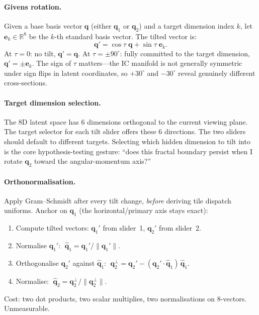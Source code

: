 \documentclass[11pt]{report}
\begin{document}
\paragraph{Givens rotation.} Given a base basis vector $\mathbf q$ (either $\mathbf q_1$ or $\mathbf q_2$) and a target dimension index $k$, let $\mathbf e_k\in\mathbb R^8$ be the $k$-th standard basis vector. The tilted vector is:
\[
\boxed{\mathbf q'=\cos\tau\;\mathbf q+\sin\tau\;\mathbf e_k.}
\]
At $\tau=0$: no tilt, $\mathbf q'=\mathbf q$. At $\tau=\pm 90^\circ$: fully committed to the target dimension, $\mathbf q'=\pm\mathbf e_k$. The sign of $\tau$ matters---the IC manifold is not generally symmetric under sign flips in latent coordinates, so $+30^\circ$ and $-30^\circ$ reveal genuinely different cross-sections.

\paragraph{Target dimension selection.} The 8D latent space has 6 dimensions orthogonal to the current viewing plane. The target selector for each tilt slider offers these 6 directions. The two sliders should default to different targets. Selecting which hidden dimension to tilt into is the core hypothesis-testing gesture: ``does this fractal boundary persist when I rotate $\mathbf q_2$ toward the angular-momentum axis?''

\paragraph{Orthonormalisation.} Apply Gram--Schmidt after every tilt change, \emph{before} deriving tile dispatch uniforms. Anchor on $\mathbf q_1$ (the horizontal/primary axis stays exact):
\begin{enumerate}[nosep]
\item Compute tilted vectors: $\mathbf q_1'$ from slider~1, $\mathbf q_2'$ from slider~2.
\item Normalise $\mathbf q_1'$: $\;\hat{\mathbf q}_1 = \mathbf q_1'/\|\mathbf q_1'\|$.
\item Orthogonalise $\mathbf q_2'$ against $\hat{\mathbf q}_1$: $\;\mathbf q_2^\perp = \mathbf q_2' - (\mathbf q_2'\cdot\hat{\mathbf q}_1)\,\hat{\mathbf q}_1$.
\item Normalise: $\;\hat{\mathbf q}_2 = \mathbf q_2^\perp / \|\mathbf q_2^\perp\|$.
\end{enumerate}
Cost: two dot products, two scalar multiplies, two normalisations on 8-vectors. Unmeasurable.
\end{document}
